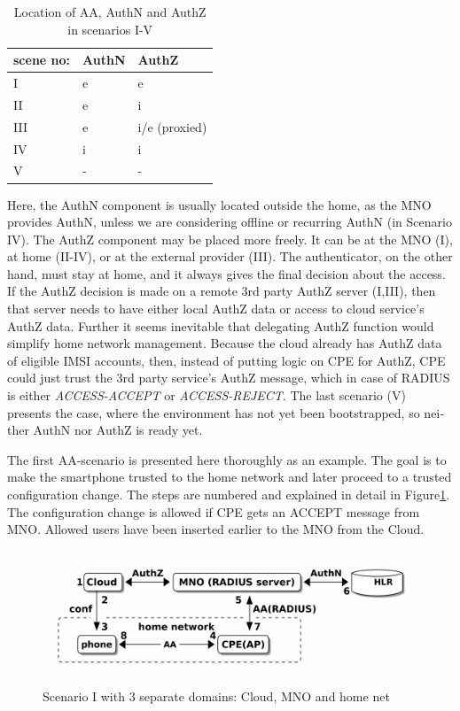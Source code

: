 \documentclass[12pt,a4paper,english]{tutthesis}
\begin{document}
\begin{otherlanguage}{english}
\begin{table}[htb]
\caption{\label{table-scenarios}Location of AA, AuthN and AuthZ in scenarios I-V}
\centering
\begin{tabular}{lll}
scene no: & AuthN & AuthZ\\
\hline
I & e & e\\
II & e & i\\
III & e & i/e (proxied)\\
IV & i & i\\
V & - & -\\
\end{tabular}
\end{table}
Here, the AuthN component is usually located outside the home, as the MNO provides AuthN, unless
we are considering offline or recurring AuthN (in Scenario IV).
The AuthZ component may be placed more freely. It can be at
the MNO (I), at home (II-IV), or at the external provider (III).
The authenticator, on the other hand, must stay at home, and it always 
gives the final decision about the access.
If the AuthZ decision is made on a remote 3rd party AuthZ server (I,III), 
then that server needs to have either local AuthZ data or access to 
cloud service's AuthZ data.
Further it seems inevitable that delegating AuthZ function 
would simplify home network management. Because the cloud
already has AuthZ data of eligible IMSI accounts,
then, instead of putting logic on CPE for AuthZ, CPE
could just trust the 3rd party service's AuthZ message, which in case
of RADIUS is either \emph{ACCESS-ACCEPT} or \emph{ACCESS-REJECT}.
The last scenario (V) presents the case, where the environment has
not yet been bootstrapped, so neither AuthN nor AuthZ is ready yet.




\label{scenario-i}
The first AA-scenario is presented here thoroughly as an example.
The goal is to make the smartphone trusted to the home network and
later proceed to  a trusted configuration change.
The steps are numbered and explained in detail in Figure\ref{fig:scenario-I}.
The configuration change is allowed if CPE gets an ACCEPT message from
MNO. Allowed users have been inserted earlier to the MNO from the Cloud.


\begin{figure}[htb]
\centering
\includegraphics[width=.9\linewidth]{scenI.png}
\caption{\label{fig:scenario-I}Scenario I with 3 separate domains: Cloud, MNO and home net}
\end{figure}


\end{otherlanguage}
\end{document}

